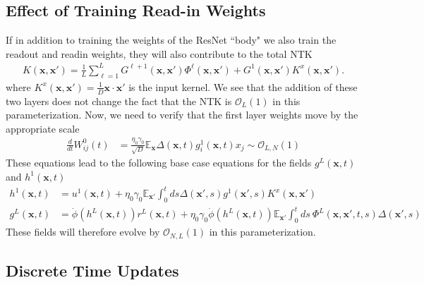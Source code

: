 \documentclass{article} %
\def\x{\bm x}
\begin{document}
\subsection{Effect of Training Read-in Weights}\label{app:readin_readout}

If in addition to training the weights of the ResNet ``body" we also train the readout and readin weights, they will also contribute to the total NTK
\begin{align}
    K(\x,\x') =  \frac{1}{L} \sum_{\ell=1}^{L} G^{\ell+1}(\x,\x') \Phi^\ell(\x,\x') + G^1(\x,\x') K^x(\x,\x')  .
\end{align}
where $K^x(\x,\x') = \frac{1}{D} \x \cdot \x'$ is the input kernel. We see that the addition of these two layers does not change the fact that the NTK is $\mathcal{O}_L(1)$ in this parameterization. Now, we need to verify that the first layer weights move by the appropriate scale
\begin{align}
    \frac{d}{dt} W^0_{ij}(t) &= \frac{\eta_0 \gamma_0 }{\sqrt D} \mathbb{E}_{\x} \Delta(\x,t) g^1_i(\x,t) x_j \sim \mathcal{O}_{L,N}(1) 
\end{align}
These equations lead to the following base case equations for the fields $g^L(\x,t)$ and $h^1(\x,t)$
\begin{align}
    h^1(\x,t) &= u^1(\x, t) + \eta_0 \gamma_0 \mathbb{E}_{\x'} \int_0^t ds  \Delta(\x',s) g^1(\x',s) K^x(\x,\x')  \nonumber
    \\
    g^L(\x,t) &= \dot\phi(h^L(\x,t)) r^L(\x,t) +  \eta_0 \gamma_0  \dot\phi(h^L(\x,t))  \mathbb{E}_{\x'} \int_0^t ds \ \Phi^L(\x,\x',t,s)  \Delta(\x',s) 
\end{align}
These fields will therefore evolve by $\mathcal{O}_{N,L}(1)$ in this parameterization. 

\subsection{Discrete Time Updates}
\end{document}
